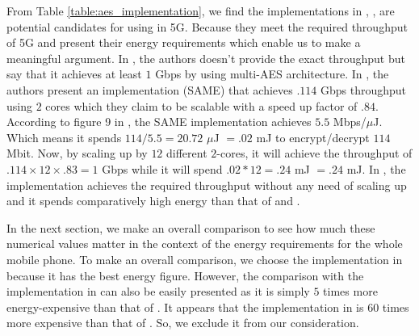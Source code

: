 \documentclass[lnicst,sechang,a4paper]{svmultln}
\begin{document}
From Table \ref{table:aes_implementation}, we find the implementations in \cite{Ruhr_2009}, \cite{Ruhr_2011}, \cite{Pune_2012} are potential candidates for using in 5G. Because they meet the required throughput of 5G and present their energy requirements which enable us to make a meaningful argument. In \cite{Ruhr_2009}, the authors doesn't provide the exact throughput but say that it achieves at least $1$ Gbps by using multi-AES architecture. In \cite{Ruhr_2011}, the authors present an implementation (SAME) that achieves $.114$ Gbps throughput using $2$ cores which they claim to be scalable with a speed up factor of $.84$. According to figure 9 in \cite{Ruhr_2011}, the SAME implementation achieves $5.5$ Mbps/$\mu$J. Which means it spends $114/5.5 = 20.72$ $\mu$J $=.02$ mJ to encrypt/decrypt $114$ Mbit. Now, by scaling up by $12$ different $2$-cores, it will achieve the throughput of $.114 \times 12 \times .83 = 1$ Gbps while it will spend $.02*12=.24$ mJ $=.24$ mJ. In \cite{Pune_2012}, the implementation achieves the required throughput without any need of scaling up and it spends comparatively high energy than that of \cite{Ruhr_2009} and \cite{Ruhr_2011}. 

In the next section, we make an overall comparison to see how much these numerical values matter in the context of the energy requirements for the whole mobile phone. To make an overall comparison, we choose the implementation in \cite{Ruhr_2011} because it has the best energy figure. However, the comparison with the implementation in \cite{Ruhr_2009} can also be easily presented as it is simply $5$ times more energy-expensive than that of \cite{Ruhr_2011}. It appears that the implementation in \cite{Pune_2012} is $60$ times more expensive than that of \cite{Ruhr_2011}. So, we exclude it from our consideration. 
\end{document}
